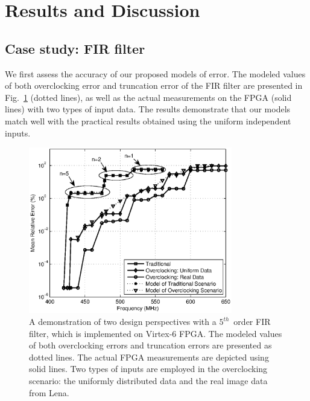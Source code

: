 \documentclass[prodmode,acmtrets]{acmsmall} %
\begin{document}
\section{Results and Discussion}\label{Section_Experiments}
\subsection{Case study: FIR filter}
We first assess the accuracy of our proposed models of error. The modeled values of both overclocking error and truncation error of the FIR filter are presented in Fig.~\ref{FIR} (dotted lines), as well as the actual measurements on the FPGA (solid lines) with two types of input data. The results demonstrate that our models match well with the practical results obtained using the uniform independent inputs.
\begin{figure}[tbp]
  \centering
  \includegraphics[width=3.5in]{./Figures/Exp/FIR/FIR_Error_New_TCAD.eps}
  \caption{A demonstration of two design perspectives with a $5^{th}$~order FIR filter, which is implemented on Virtex-6 FPGA. The modeled values of both overclocking errors and truncation errors are presented as dotted lines. The actual FPGA measurements are depicted using solid lines. Two types of inputs are employed in the overclocking scenario: the uniformly distributed data and the real image data from Lena.}
  \label{FIR}
\end{figure}
\end{document}
